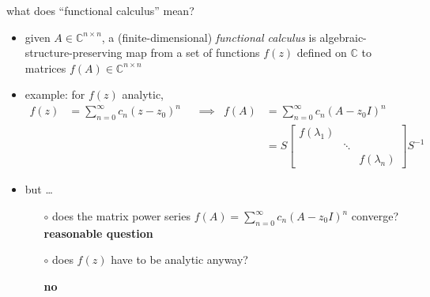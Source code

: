 \documentclass[10pt,hyperref]{beamer}
\newcommand{\CC}{\mathbb{C}}
\begin{document}
\begin{frame}{what does ``functional calculus'' mean?}

\begin{itemize}
\item given $A\in\CC^{n\times n}$, a (finite-dimensional) \emph{functional calculus} is algebraic-structure-preserving map from a set of functions $f(z)$ defined on $\CC$ to matrices $f(A)\in\CC^{n\times n}$
\item example: for $f(z)$ analytic,
\small
\begin{align*}
f(z) &= \sum_{n=0}^\infty c_n (z-z_0)^n & &\implies & f(A) &= \sum_{n=0}^\infty c_n (A-z_0 I)^n \\
     &&&& &= S \begin{bmatrix} f(\lambda_1) & & \\ & \ddots & \\ & & f(\lambda_n) \end{bmatrix} S^{-1}
\end{align*}
\normalsize
\item but \dots
    \begin{itemize}
    \item[$\circ$] does the matrix power series $f(A) = \sum_{n=0}^\infty c_n (A-z_0 I)^n$ converge? \textbf{reasonable question}
    \item[$\circ$] does $f(z)$ have to be analytic anyway?
    
     \textbf{no}
    \end{itemize}
\end{itemize}
\end{frame}
\end{document}
